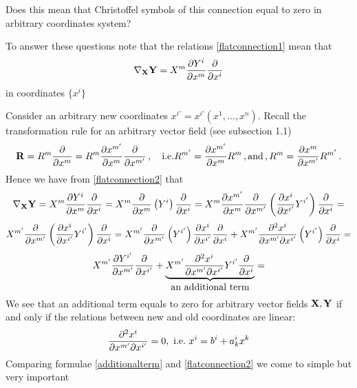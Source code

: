 \documentclass[12pt]{article}
\theoremstyle{theorem}
\numberwithin{equation}{section}
\begin{document}
 Does this mean that  Christoffel symbols of this connection equal to zero in arbitrary coordinates system?



 To answer these questions note that the relations \eqref{flatconnection1} mean that
 \begin{equation}\label{flatconnection2}
    \nabla_{\bf X} {\bf Y}=X^m{\partial Y^i\over \partial x^m}
    {\partial\over \partial x^i}
 \end{equation}
in coordinates $\{x^i\}$

Consider  an arbitrary new coordinates $x^{i'}=x^{i'}(x^1,\dots,x^n)$.
Recall the transformation rule  for an arbitrary vector field (see subsection 1.1)
            $$
   {\bf R}=R^{m}{\partial \over \partial x^{m}}=R^{m}{\partial x^{m'}\over \partial x^{m}}{\partial \over \partial x^{m'}}
   \,,\quad {\rm i.e.} R^{m'}={\partial x^{m'}\over \partial x^{m}}R^m \,,{\rm and}\,,
              R^{m}={\partial x^{m}\over \partial x^{m'}}R^{m'}\,.
            $$
Hence we have from \eqref{flatconnection2} that
            $$
 \nabla_{\bf X} {\bf Y}=X^{m}{\partial Y^{i}\over \partial x^{m}}{\partial\over \partial x^i}=
 X^{m}{\partial \over \partial x^{m}}\left(Y^{i}\right){\partial\over \partial x^i}=
 X^{m}{\partial x^{m'}\over \partial x^{m}}{\partial \over \partial x^{m'}}\left({\partial x^{i}\over \partial x^{i'}}Y^{i'}\right){\partial\over \partial x^i}=
                     $$
                     $$
                     X^{m'}{\partial \over \partial x^{m'}}\left({\partial x^{i}\over \partial x^{i'}}Y^{i'}\right)
                     {\partial\over \partial x^i}=
         X^{m'}{\partial \over \partial x^{m'}}\left(Y^{i'}\right)
         {\partial x^{i}\over \partial x^{i'}}{\partial\over \partial x^i}+
          X^{m'}{\partial^2 x^{i}\over \partial x^{m'}\partial x^{i'}}
          \left(Y^{i'}\right)
          {\partial\over \partial x^i}=
                        $$
                        \begin{equation}\label{flatconnecctiontransformation}
         X^{m'}{\partial Y^{i'}\over \partial x^{m'}}{\partial\over \partial x^{i'}}+
         \underbrace {X^{m'}{\partial^2 x^{i}\over \partial x^{m'}\partial x^{i'}}Y^{i'}
          {\partial\over \partial x^i}}_{\hbox {an additional term}}=
                        \end{equation}
We see that an additional term  equals to zero for arbitrary vector fields ${\bf X},{\bf Y}$ if and only if
the relations between new and old coordinates are linear:
                    \begin{equation}\label{additionalterm}
                    {\partial^2 x^{i}\over \partial x^{m'}\partial x^{i'}}=0, \,\,{\rm i.e.}\,\,
                    x^i=b^i+a^i_kx^k
                    \end{equation}
 Comparing formulae \eqref{additionalterm} and \eqref{flatconnection2}
 we come to simple but very important
\end{document}
